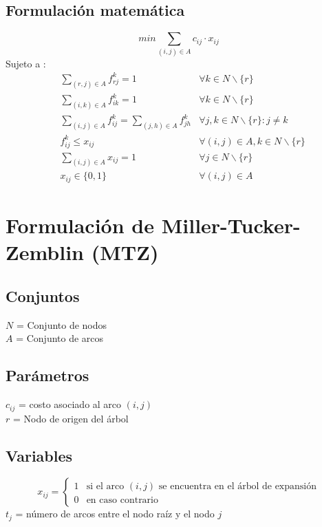 \documentclass{article}
\numberwithin{equation}{section}
\begin{document}
\subsection{Formulación matemática}
\begin{equation}
min \sum_{(i,j) \in A} c_{ij} \cdot x_{ij}
\end{equation}
Sujeto a : \begin{align}
& \sum_{(r,j) \in A} f_{rj}^k = 1 &\forall k \in N \backslash \{r\}\\
& \sum_{(i,k) \in A} f_{ik}^k = 1 &\forall k \in N \backslash \{r\}\\
& \sum_{(i,j) \in A} f_{ij}^k = \sum_{(j,h) \in A} f_{jh}^k &\forall j,k \in N \backslash \{r\} : j \neq k \\
& f_{ij}^k \leq x_{ij} &\forall (i,j) \in A, k \in N \backslash \{r\}\\
& \sum_{(i,j) \in A} x_{ij} = 1 &\forall j \in N \backslash \{r\}\\
& x_{ij} \in \{0,1\} &\forall (i,j) \in A
\end{align}

\newpage
\section{Formulación de Miller-Tucker-Zemblin (MTZ)}
\subsection{Conjuntos}
$N$ = Conjunto de nodos\\
$A$ = Conjunto de arcos
\subsection{Parámetros}
$c_{ij}$ = costo asociado al arco $(i,j)$\\
$r$ = Nodo de origen del árbol
\subsection{Variables}
\begin{center}
\[x_{ij}={\begin{cases}1&{\mbox{si el arco $(i,j)$ se encuentra en el árbol de expansión}}\\0&{\mbox{en caso contrario}}\end{cases}}
\]
$t_{j}$ = número de arcos entre el nodo raíz y el nodo $j$
\end{center}
\end{document}
